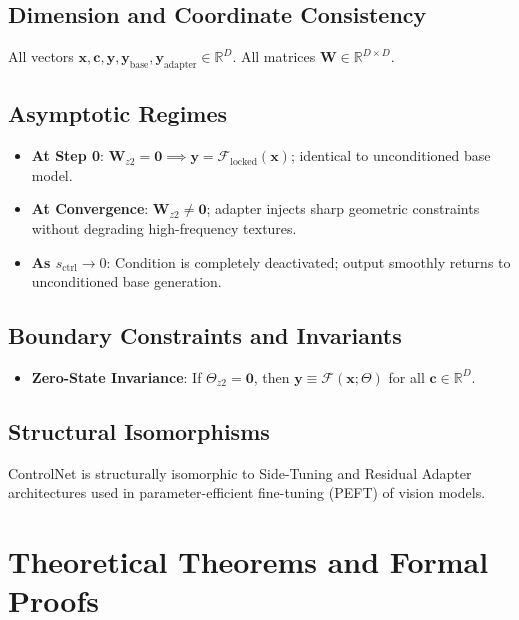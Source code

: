 \documentclass[11pt,a4paper]{article}
\theoremstyle{definition}
\begin{document}
\subsection{Dimension and Coordinate Consistency}
All vectors $\mathbf{x}, \mathbf{c}, \mathbf{y}, \mathbf{y}_{\text{base}}, \mathbf{y}_{\text{adapter}} \in \mathbb{R}^D$. All matrices $\mathbf{W} \in \mathbb{R}^{D \times D}$.

\subsection{Asymptotic Regimes}
\begin{itemize}
    \item \textbf{At Step 0}: $\mathbf{W}_{z2} = \mathbf{0} \implies \mathbf{y} = \mathcal{F}_{\text{locked}}(\mathbf{x})$; identical to unconditioned base model.
    \item \textbf{At Convergence}: $\mathbf{W}_{z2} \ne \mathbf{0}$; adapter injects sharp geometric constraints without degrading high-frequency textures.
    \item \textbf{As $s_{\text{ctrl}} \to 0$}: Condition is completely deactivated; output smoothly returns to unconditioned base generation.
\end{itemize}

\subsection{Boundary Constraints and Invariants}
\begin{itemize}
    \item \textbf{Zero-State Invariance}: If $\Theta_{z2} = \mathbf{0}$, then $\mathbf{y} \equiv \mathcal{F}(\mathbf{x}; \Theta)$ for all $\mathbf{c} \in \mathbb{R}^D$.
\end{itemize}

\subsection{Structural Isomorphisms}
ControlNet is structurally isomorphic to Side-Tuning and Residual Adapter architectures used in parameter-efficient fine-tuning (PEFT) of vision models.

\section{Theoretical Theorems and Formal Proofs}
\end{document}
